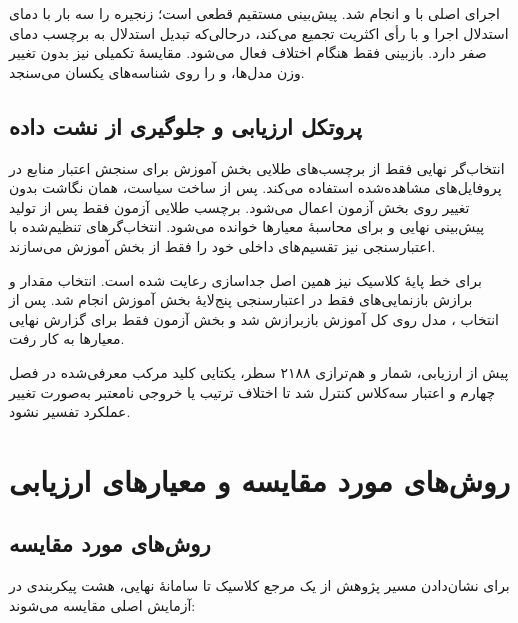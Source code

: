 اجرای اصلی با  و  انجام شد. پیش‌بینی مستقیم قطعی است؛  زنجیره را سه بار با دمای استدلال  اجرا و با رأی اکثریت تجمیع می‌کند، درحالی‌که تبدیل استدلال به برچسب دمای صفر دارد. بازبینی فقط هنگام اختلاف فعال می‌شود. مقایسۀ تکمیلی نیز بدون تغییر وزن مدل‌ها،  و  را روی شناسه‌های یکسان می‌سنجد.

\subsection{پروتکل ارزیابی و جلوگیری از نشت داده}

انتخاب‌گر نهایی فقط از برچسب‌های طلایی بخش آموزش برای سنجش اعتبار منابع در پروفایل‌های مشاهده‌شده استفاده می‌کند. پس از ساخت سیاست، همان نگاشت بدون تغییر روی بخش آزمون اعمال می‌شود. برچسب طلایی آزمون فقط پس از تولید پیش‌بینی نهایی و برای محاسبۀ معیارها خوانده می‌شود. انتخاب‌گرهای تنظیم‌شده با اعتبارسنجی نیز تقسیم‌های داخلی خود را فقط از بخش آموزش می‌سازند.

برای خط پایۀ کلاسیک نیز همین اصل جداسازی رعایت شده است. انتخاب مقدار  و برازش بازنمایی‌های  فقط در اعتبارسنجی پنج‌لایۀ بخش آموزش انجام شد. پس از انتخاب ، مدل روی کل آموزش بازبرازش شد و بخش آزمون فقط برای گزارش نهایی معیارها به کار رفت.

پیش از ارزیابی، شمار و هم‌ترازی ۲۱۸۸ سطر، یکتایی کلید مرکب معرفی‌شده در فصل چهارم و اعتبار سه‌کلاس کنترل شد تا اختلاف ترتیب یا خروجی نامعتبر به‌صورت تغییر عملکرد تفسیر نشود.

\section{روش‌های مورد مقایسه و معیارهای ارزیابی}

\subsection{روش‌های مورد مقایسه}

برای نشان‌دادن مسیر پژوهش از یک مرجع کلاسیک تا سامانۀ نهایی، هشت پیکربندی در آزمایش اصلی مقایسه می‌شوند:

